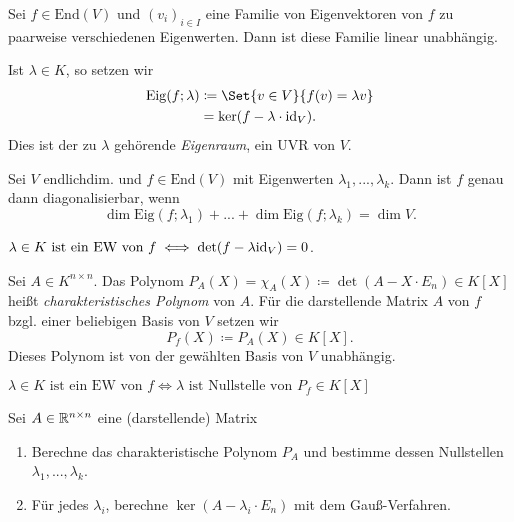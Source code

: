 \documentclass{cheat-sheet}
\newcommand{\End}{\mathrm{End}}
\newcommand{\Eig}{\mathrm{Eig}}
\begin{document}
\begin{satz}
  Sei $f \in \End(V)$ und $(v_i)_{i \in I}$ eine Familie von Eigenvektoren von $f$ zu paarweise verschiedenen Eigenwerten. Dann ist diese Familie linear unabhängig.
\end{satz}

\begin{defn}
  Ist $\lambda \in K$, so setzen wir
  \begin{align*}
    \Eig(f; \lambda) &\coloneqq \Set{ v \in V }{ f(v) = \lambda v }\\
    &= \ker(f - \lambda \cdot \id_V).
  \end{align*}
  Dies ist der zu $\lambda$ gehörende \emph{Eigenraum}, ein UVR von $V$.
\end{defn}

\begin{satz}
  Sei $V$ endlichdim. und $f \in \End(V)$ mit Eigenwerten $\lambda_1, ..., \lambda_k$. Dann ist $f$ genau dann diagonalisierbar, wenn
  \[ \dim \Eig(f; \lambda_1) + ... + \dim \Eig(f; \lambda_k) = \dim V. \]
\end{satz}

\begin{satz}
  $\lambda \in K \text{ ist ein EW von } f \iff \det(f - \lambda \mathrm{id}_V) = 0$.
\end{satz}

\begin{defn}
  Sei $A \in K^{n \times n}$. Das Polynom $P_A(X) = \chi_A(X) \coloneqq \det(A - X \cdot E_n) \in K[X]$ heißt \emph{charakteristisches Polynom} von $A$. Für die darstellende Matrix $A$ von $f$ bzgl. einer beliebigen Basis von $V$ setzen wir
  \[ P_f(X) \coloneqq P_A(X) \in K[X]. \]
  Dieses Polynom ist von der gewählten Basis von $V$ unabhängig.
\end{defn}

\begin{satz}
  $\lambda \in K \text{ ist ein EW von } f \iff \lambda \text{ ist Nullstelle von } P_f \in K[X]$
\end{satz}

\begin{verf}
  Sei $A \in \mathbb{R}^{n \times n}$ eine (darstellende) Matrix
  \begin{enumerate}
    \item Berechne das charakteristische Polynom $P_A$ und bestimme dessen Nullstellen $\lambda_1, ..., \lambda_k$.
    \item Für jedes $\lambda_i$, berechne $\ker (A - \lambda_i \cdot E_n)$ mit dem Gauß-Verfahren.
  \end{enumerate}
\end{verf}
\end{document}
